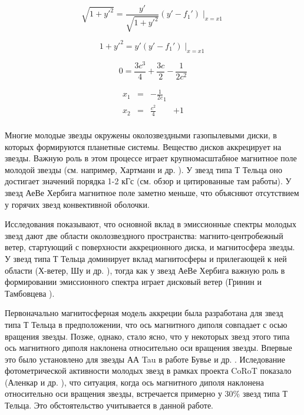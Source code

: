 \documentclass{article}
\begin{document}
\begin{equation}
\sqrt{1+y'^2} = \frac{y'}{\sqrt{1+y'^2}} (y' - f_1')\mid_{x=x1}
\end{equation}

\begin{equation}
1+y'^2 = y' (y' - f_1')\mid_{x=x1}
\end{equation}

\begin{equation}
0 = \frac{3c^3}{4} + \frac{3c}{2} - \frac{1}{2c^2}
\end{equation}

\begin{equation}
\begin{aligned}
x_1 & = & -\frac{1}{2c}_1& \\
x_2 & = & \frac{c^2}{4}& + 1 \\
\end{aligned}
\end{equation}

     
Многие молодые звезды окружены околозвездными газопылевыми диски, в которых формируются планетные системы. Вещество дисков аккрецирует на звезды. 
Важную роль в этом процессе играет крупномасштабное магнитное поле молодой звезды (см. например, Хартманн и др. \cite{hartman94}). 
У звезд типа Т Тельца оно достигает значений порядка 1-2 кГс (см. обзор \cite{petrov} и цитированные там работы). У звезд АеВе Хербига магнитное поле 
заметно меньше, что объясняют отсутствием у горячих звезд конвективной оболочки. 

Исследования показывают, что основной вклад в эмиссионные спектры молодых звезд дают две области околозвездного пространства: 
магнито-центробежный ветер, стартующий с поверхности аккреционного диска, и магнитосфера звезды. 
У звезд типа Т Тельца доминирует вклад магнитосферы и прилегающей к ней области (Х-ветер, Шу и др. \cite{shu94}), тогда как у звезд АеВе Хербига важную роль 
в формировании эмиссионного спектра играет дисковый ветер (Гринин и Тамбовцева \cite{grinin11}). 
        
Первоначально магнитосферная модель аккреции была разработана для звезд типа Т Тельца \cite{hartman94} в предположении, что ось магнитного диполя совпадает
с осью вращения звезды. Позже, однако, стало ясно, что у некоторых звезд этого типа ось магнитного диполя наклонена относительно оси вращения 
звезды. Впервые это было установлено для звезды АА Tau в работе Бувье и др. \cite{buve99}. Иследование фотометрической активности молодых звезд в рамках 
проекта CoRoT показало (Аленкар и др. \cite{alenkar10}), что ситуация, когда ось магнитного диполя наклонена относительно оси вращения звезды,
встречается примерно у 30\% звезд типа Т Тельца.  Это обстоятельство учитывается в данной работе.
\end{document}
